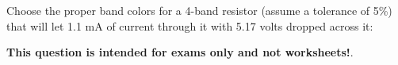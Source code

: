 

Choose the proper band colors for a 4-band resistor (assume a tolerance of 5\%) that will let 1.1 mA of current through it with 5.17 volts dropped across it:

\vskip 10pt

\underbar{\hskip 30pt} \hskip 30pt  \underbar{\hskip 30pt} \hskip 30pt  \underbar{\hskip 30pt} \hskip 30pt \underbar{\hskip 30pt}







 \hskip 30pt   \hskip 30pt   \hskip 30pt 







{\bf This question is intended for exams only and not worksheets!}.



